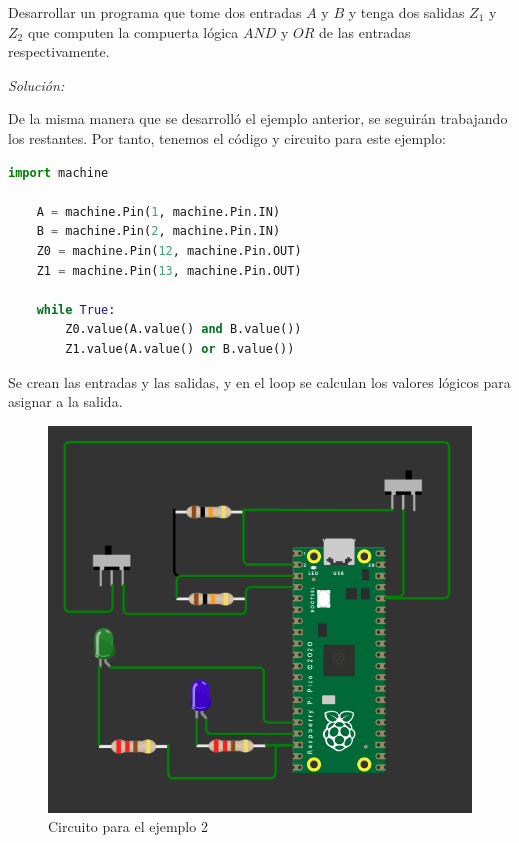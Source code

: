\documentclass{article}
\begin{document}
    Desarrollar un programa que tome dos entradas $A$ y $B$ y tenga dos salidas $Z_1$ y $Z_2$ que computen la compuerta lógica $AND$ y $OR$ de las entradas respectivamente.

    \bigbreak

    \textit{Solución:}

    \bigbreak

    De la misma manera que se desarrolló el ejemplo anterior, se seguirán trabajando los restantes. Por tanto, tenemos el código y circuito para este ejemplo:

    \begin{lstlisting}[language=Python, caption={Programa para el ejemplo 2}]
    import machine

    A = machine.Pin(1, machine.Pin.IN)
    B = machine.Pin(2, machine.Pin.IN)
    Z0 = machine.Pin(12, machine.Pin.OUT)
    Z1 = machine.Pin(13, machine.Pin.OUT)

    while True:
        Z0.value(A.value() and B.value())
        Z1.value(A.value() or B.value())
    \end{lstlisting}

    Se crean las entradas y las salidas, y en el loop se calculan los valores lógicos para asignar a la salida.

    \begin{figure}[H]
        \centering
        \includegraphics[width=0.5\paperwidth]{images/wokwi-example-2-circuit}
        \caption{Circuito para el ejemplo 2}
    \end{figure}
\end{document}
